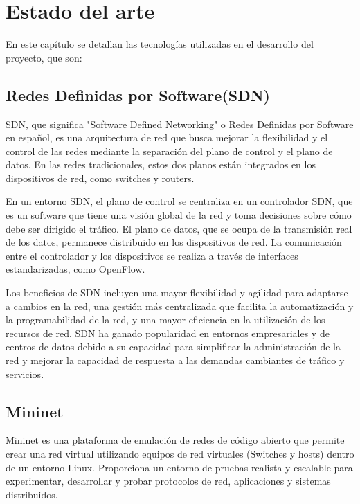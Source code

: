 \documentclass[a4paper, 12pt]{book}
\begin{document}
	\cleardoublepage
	\chapter{Estado del arte}
	\label{sec:arte}
	 
		
	En este capítulo se detallan las tecnologías utilizadas en el desarrollo del proyecto, que son:
	
	
	\section{Redes Definidas por Software(SDN)} 
	\label{sec:sdn}
	
	SDN, que significa "Software Defined Networking" o Redes Definidas por Software en español, es una arquitectura de red que busca mejorar la flexibilidad y el control de las redes mediante la separación del plano de control y el plano de datos. En las redes tradicionales, estos dos planos están integrados en los dispositivos de red, como switches y routers.
	
	En un entorno SDN, el plano de control se centraliza en un controlador SDN, que es un software que tiene una visión global de la red y toma decisiones sobre cómo debe ser dirigido el tráfico. El plano de datos, que se ocupa de la transmisión real de los datos, permanece distribuido en los dispositivos de red. La comunicación entre el controlador y los dispositivos se realiza a través de interfaces estandarizadas, como OpenFlow.
	
	Los beneficios de SDN incluyen una mayor flexibilidad y agilidad para adaptarse a cambios en la red, una gestión más centralizada que facilita la automatización y la programabilidad de la red, y una mayor eficiencia en la utilización de los recursos de red. SDN ha ganado popularidad en entornos empresariales y de centros de datos debido a su capacidad para simplificar la administración de la red y mejorar la capacidad de respuesta a las demandas cambiantes de tráfico y servicios.
	
	\section{Mininet} 
	\label{sec:mininet}
	
	Mininet es una plataforma de emulación de redes de código abierto que permite crear una red virtual utilizando equipos de red virtuales (Switches y hosts) dentro de un entorno Linux. Proporciona un entorno de pruebas realista y escalable para experimentar, desarrollar y probar protocolos de red, aplicaciones y sistemas distribuidos.
	
\end{document}
